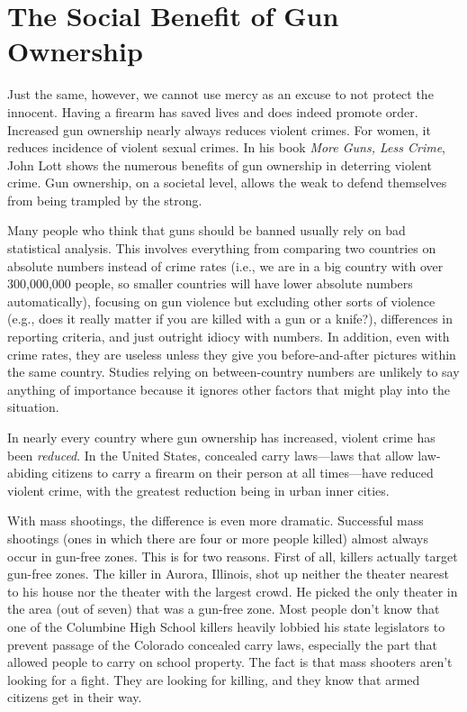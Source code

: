 \section{The Social Benefit of Gun Ownership}

Just the same, however, we cannot use mercy as an excuse to not protect
the innocent. Having a firearm has saved lives and does indeed promote
order. Increased gun ownership nearly always reduces violent crimes.
For women, it reduces incidence of violent sexual crimes.  In his book
\textit{More Guns, Less Crime}, John Lott shows the numerous benefits
of gun ownership in deterring violent crime.  Gun ownership, on a
societal level, allows the weak to defend themselves from being
trampled by the strong.

Many people who think that guns should be banned usually rely on bad
statistical analysis. This involves everything from comparing two
countries on absolute numbers instead of crime rates (i.e., we are in a
big country with over 300,000,000 people, so smaller countries will
have lower absolute numbers automatically), focusing on gun violence
but excluding other sorts of violence
(e.g., does it really
matter if you are killed with a gun or a knife?), differences in
reporting criteria, and just outright idiocy with numbers. In addition,
even with crime rates, they are useless unless they give you
before-and-after pictures within the same country. Studies relying on
between-country numbers are unlikely to say anything of importance
because it ignores other factors that might play into the situation.

In nearly every country where gun ownership has increased, violent crime
has been \textit{reduced}. In the United States, concealed carry
laws—laws that allow law-abiding citizens to carry a firearm on their
person at all times—have reduced violent crime, with the greatest
reduction being in urban inner cities. 

With mass shootings, the difference is even more dramatic. Successful
mass shootings (ones in which there are four or more people killed)
almost always occur in gun-free zones. This is for two reasons. First
of all, killers actually target gun-free zones. The killer in Aurora,
Illinois, shot up neither the theater nearest to his house nor the
theater with the largest crowd. He picked the only theater in the area
(out of seven) that was a gun-free zone. Most people don’t know that
one of the Columbine High School killers heavily lobbied
his state legislators
to prevent passage of the Colorado concealed carry laws, especially the
part that
allowed people to
carry on school property. The fact is that mass shooters aren’t looking
for a fight. They are looking for killing, and they know that armed
citizens get in their way.

